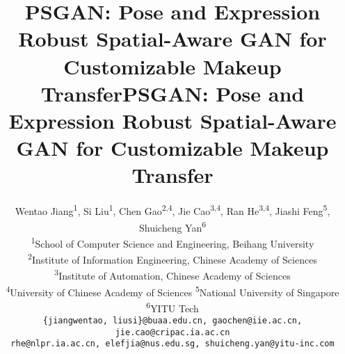 \title{PSGAN: Pose and Expression Robust Spatial-Aware GAN for Customizable Makeup Transfer}



\vspace{-5mm}
\newcommand\myfigure{
\centering
    \texttt{[image: figures/first\_big.pdf]}
\captionof{figure}{Our model allows users to control both the shade of makeup and facial parts to transfer. The first row on the left shows the results of only transferring partial makeup style from the reference. The second row shows the results with controllable shades. Moreover, our method can perform makeup transfer between images that have different poses and expressions, as shown on the right part of the figure. Best viewed in color.}
\label{p1}
}

\title{PSGAN: Pose and Expression Robust Spatial-Aware GAN for Customizable Makeup Transfer}

\author{Wentao Jiang\textsuperscript{\rm 1}, Si Liu\textsuperscript{\rm 1}, Chen Gao\textsuperscript{\rm 2,4}, Jie Cao\textsuperscript{\rm 3,4}, Ran He\textsuperscript{\rm 3,4}, Jiashi Feng\textsuperscript{\rm 5}, Shuicheng Yan\textsuperscript{\rm 6} \\ 
\textsuperscript{\rm 1}School of Computer Science and Engineering, Beihang University \\
\textsuperscript{\rm 2}Institute of Information Engineering, Chinese Academy of Sciences \\
\textsuperscript{\rm 3}Institute of Automation, Chinese Academy of Sciences \\
\textsuperscript{\rm 4}University of Chinese Academy of Sciences 
\textsuperscript{\rm 5}National University of Singapore 
\textsuperscript{\rm 6}YITU Tech \\
{\tt\small \{jiangwentao, liusi\}@buaa.edu.cn, gaochen@iie.ac.cn, jie.cao@cripac.ia.ac.cn} \\  {\tt\small rhe@nlpr.ia.ac.cn, elefjia@nus.edu.sg, shuicheng.yan@yitu-inc.com}
}

\maketitle
 
